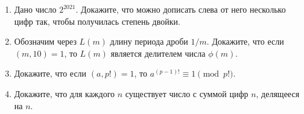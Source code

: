 \documentclass{article}
\begin{document}
\begin{enumerate}[label*=\protect\fbox{\arabic{enumi}}]
\item Дано число $2^{2021}$. Докажите, что можно дописать слева от него несколько цифр так, чтобы получилась степень двойки.

\item Обозначим через  $L(m)$  длину периода дроби $1/m$. Докажите, что если  $(m, 10) = 1$,  то  $L(m)$  является делителем числа $\phi(m)$.

\item Докажите, что если $(a, p!) = 1$, то $a^{(p-1)!} \equiv 1 \pmod{p!}$.

\item Докажите, что для каждого $n$ существует число с суммой цифр $n$, делящееся на $n$.

\end{enumerate}
\end{document}
